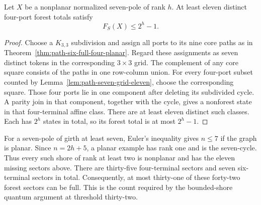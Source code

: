 \begin{theorem}
\label{thm:path-seven-eleven-missing-sectors}
Let $X$ be a nonplanar normalized seven-pole of rank $h$.
At least eleven distinct four-port forest totals satisfy
\[
 F_S(X)\le2^h-1.
\]
\end{theorem}

\begin{proof}
Choose a $K_{3,3}$ subdivision and assign all ports to its nine core paths as in Theorem~\ref{thm:path-six-full-four-planar}.
Regard these assignments as seven distinct tokens in the corresponding $3\times3$ grid.
The complement of any core square consists of the paths in one row-column union.
For every four-port subset counted by Lemma~\ref{lem:path-seven-grid-eleven}, choose the corresponding square.
Those four ports lie in one component after deleting its subdivided cycle.
A parity join in that component, together with the cycle, gives a nonforest state in that four-terminal affine class.
There are at least eleven distinct such classes.
Each has $2^h$ states in total, so its forest total is at most $2^h-1$.
\end{proof}

For a seven-pole of girth at least seven, Euler's inequality gives $n\le7$ if the graph is planar.
Since $n=2h+5$, a planar example has rank one and is the seven-cycle.
Thus every such shore of rank at least two is nonplanar and has the eleven missing sectors above.
There are thirty-five four-terminal sectors and seven six-terminal sectors in total.
Consequently, at most thirty-one of these forty-two forest sectors can be full.
This is the count required by the bounded-shore quantum argument at threshold thirty-two.
